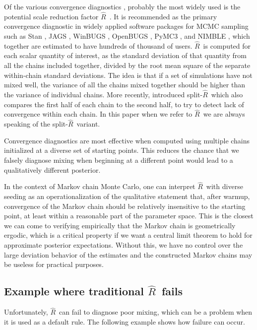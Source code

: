 \documentclass[american,]{article}
\newcommand{\Rhat}{$\widehat{R}$}
\newcommand{\sRhat}{split-$\widehat{R}$}
\theoremstyle{definition}
\begin{document}
Of the various convergence diagnostics \citep[see reviews by][]{Cowles+Carlin:1996,Mengersen+etal:1999,Robert+Casella:2004}, 
probably the most widely used  
is the potential scale reduction factor \Rhat\
\citep{Gelman+Rubin:1992, Brooks+Gelman:1998}.
It is recommended as the primary convergence diagnostic in widely applied
software packages for MCMC sampling such as Stan \citep{Stan:JSS:2017}, 
JAGS \citep{plummer2003jags}, WinBUGS \citep{WinBUGS:2000}, OpenBUGS \citep{BUGSproject:2009}, PyMC3 \citep{pymc3}, 
and NIMBLE \citep{nimble}, which together are estimated to have hundreds of thousand of users. 
\Rhat\ is computed for each scalar quantity of interest, as the standard deviation of that quantity from all the chains included together, divided by the root mean square of the separate within-chain standard deviations.
The idea is that if a set of simulations have not mixed well, the variance of
all the chains mixed together should be higher than the variance of individual chains.
More recently, \cite{BDA3} introduced \sRhat\ which also compares 
the first half of each chain to the second
half, to try to detect lack of convergence within each chain.  In this
paper when we refer to \Rhat\ we are always speaking of the \sRhat\ variant.

Convergence diagnostics are most effective when computed using multiple chains initialized at a 
diverse set of starting points. This reduces the chance that we falsely diagnose
mixing when beginning at a different point would lead to a 
qualitatively different posterior.

In the context of Markov chain Monte Carlo, one can interpret \Rhat\ 
with diverse seeding as an operationalization of the qualitative statement 
that, after warmup, convergence of the Markov chain should be relatively insensitive to the starting 
point, at least within a 
reasonable part of the parameter space. This is the closest we can come to 
verifying empirically that the Markov chain is geometrically ergodic, which is a critical 
property if we want  a central limit theorem to hold for approximate
posterior expectations. Without this, we have no control over the large
deviation behavior of the estimates and the constructed Markov chains may
be useless for practical purposes.

\subsection{Example where traditional \Rhat\ fails}

Unfortunately, \Rhat\ can fail to diagnose poor mixing, which can be a problem when it is used as a default rule. The following example shows how
failure can occur.
\end{document}
